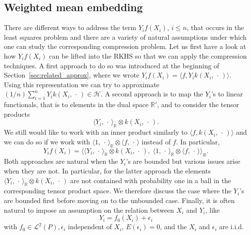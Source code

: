 \documentclass[AHL,Unicode,longabstracts,published]{cedram}
\theoremstyle{remark}
\newcommand{\R}{\mathbb{R}}
\newcommand{\cH}{\mathcal{H}}
\newcommand{\clL}{\mathcal{L}}
\begin{document}
\subsection{Weighted mean embedding} \label{sec:DealWithY}
There are different ways to address the term $Y_i f(X_i)$, $i\leq n$, that occurs in the least squares problem and there are a variety of natural assumptions under which one can study the corresponding compression problem. Let us first have a look at how $Y_i f(X_i)$ can be lifted into the RKHS so that we can apply the compression techniques. A first approach to do so was introduced at the beginning of Section~\ref{sec:related_approx}, where we wrote $Y_i f(X_i) = \langle f, Y_i k(X_i,\,\cdot\,)\rangle$. Using this representation we can try to approximate $(1/n) \sum_{i=1}^n Y_i k(X_i,\,\cdot\,) \in \cH$. A second approach is to map the $Y_i$'s to linear functionals, that is to elements in the dual space $\R'$, and to consider the tensor products
\[
\langle Y_i, \,\cdot\, \rangle_\R \otimes k(X_i,\,\cdot\,).
\]
We still would like to work with an inner product similarly to $\langle f, k(X_i,\,\cdot\,) \rangle$ and we can do so if we work with $\langle 1,\,\cdot\, \rangle_\R \otimes \langle f,\,\cdot\, \rangle$ instead of $f$. In particular,
\begin{equation}\label{eq:second_modelling_appr}
Y_i f(X_i) = \bigl\langle \langle Y_i, \,\cdot\, \rangle_\R \otimes k(X_i,\,\cdot\,),\; \langle 1,\,\cdot\, \rangle_\R \otimes \langle f,\,\cdot\, \rangle \bigr\rangle_\otimes.
\end{equation}
Both approaches are natural when the $Y_i$'s are bounded but various issues arise when they are not. In particular, for the latter approach the elements $ \langle Y_i, \,\cdot\, \rangle_\R \otimes k(X_i,\,\cdot\,)$ are not contained with probability one in a ball in the corresponding tensor product space. We therefore discuss the case where the $Y_i$'s are bounded first before moving on to the unbounded case. Finally, it is often natural to impose an assumption on the relation between $X_i$ and $Y_i$, like
\begin{equation}\label{eq:std_reg_assump}
Y_i = f_0(X_i) + \epsilon_i
\end{equation}
with $f_0 \in \clL^2(P), \epsilon_i$ independent of $X_i$, $E(\epsilon_i) = 0$, and the $X_i$ and $\epsilon_i$ are i.i.d.
\end{document}
